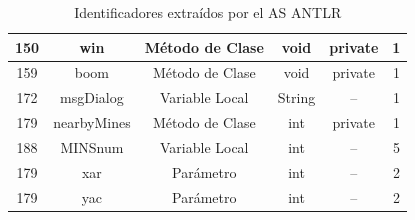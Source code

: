 \begin{table}
\begin{tabular}{| c | c | c | c | c | c | }
150&win&Método de Clase&void&private&1\\ \hline
159&boom&Método de Clase&void&private&1\\ \hline
172&msgDialog&Variable Local&String&--&1\\ \hline
179&nearbyMines&Método de Clase&int&private&1\\ \hline
188&MINSnum&Variable Local&int&--&5\\ \hline
179&xar&Parámetro&int&--&2\\ \hline
179&yac&Parámetro&int&--&2\\ \hline
   
   	\end{tabular}  
	 
   \caption{Identificadores extraídos por el AS ANTLR}
   \label{tabla2}
     
\end{table} 


